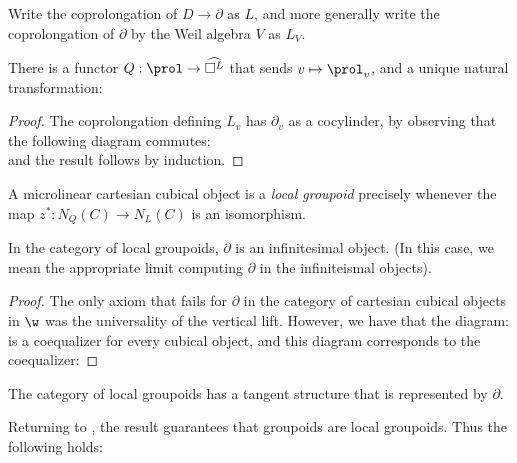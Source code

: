 \begin{notation}
    Write the coprolongation of $D \to \partial$ as $L$, and more generally write the coprolongation of $\partial$ by the Weil algebra $V$ as $L_V$.
\end{notation}


\begin{proposition}
    There is a functor $Q:\prol \to \widehat{\square^L}$ that sends $v \mapsto \prol_v$, and a unique natural transformation:
    \[\]
\end{proposition}
\begin{proof}
    The coprolongation defining $L_v$ has $\partial_v$ as a cocylinder, by observing that the following diagram commutes:
    \[\]
    and the result follows by induction.
\end{proof}

\begin{definition}
    A microlinear cartesian cubical object is a \emph{local groupoid} precisely whenever the map $z^*: N_Q(C) \to N_L(C)$ is an isomorphism.
\end{definition}
\begin{proposition}
    In the category of local groupoids, $\partial$ is an infinitesimal object. 
    (In this case, we mean the appropriate limit computing $\partial$ in the infiniteismal objects).
\end{proposition}
\begin{proof}
    The only axiom that fails for $\partial$ in the category of cartesian cubical objects in $\w$ was the universality of the vertical lift. 
    However, we have that the diagram:
    \[\]
    is a coequalizer for every cubical object, and this diagram corresponds to the coequalizer:
    
\end{proof}
\begin{corollary}
    The category of local groupoids has a tangent structure that is represented by $\partial$.
\end{corollary}
Returning to , the result  guarantees that groupoids are local groupoids.
Thus the following holds:


